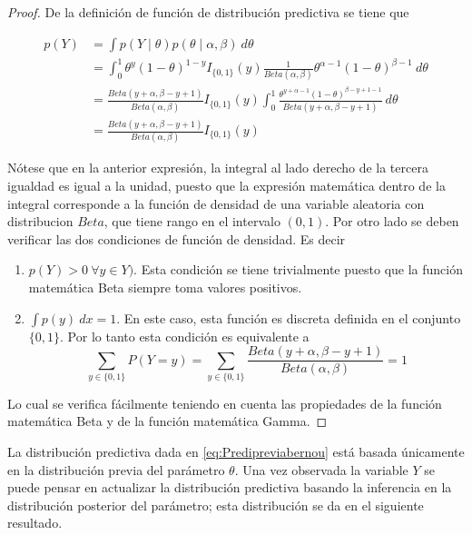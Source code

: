 \documentclass[
  10pt,
  spanish,
]{book}
\providecommand{\tightlist}{%
  \setlength{\itemsep}{0pt}\setlength{\parskip}{0pt}}
\theoremstyle{definition}
\theoremstyle{definition}
\theoremstyle{definition}
\theoremstyle{definition}
\theoremstyle{remark}
\begin{document}
\begin{proof}
{}De la definición de función de distribución predictiva se tiene que

\begin{align*}
p(Y)&=\int p(Y \mid \theta)p(\theta \mid \alpha,\beta)\ d\theta\\
&=\int_0^1 \theta^y(1-\theta)^{1-y}I_{\{0,1\}}(y)\frac{1}{Beta(\alpha,\beta)}\theta^{\alpha-1}(1-\theta)^{\beta-1}\ d\theta\\
&=\frac{Beta(y+\alpha,\beta-y+1)}{Beta(\alpha,\beta)}I_{\{0,1\}}(y)
    \int_0^1\frac{\theta^{y+\alpha-1}(1-\theta)^{\beta-y+1-1}}{Beta(y+\alpha,\beta-y+1)}\ d\theta\\
&=\frac{Beta(y+\alpha,\beta-y+1)}{Beta(\alpha,\beta)}I_{\{0,1\}}(y)
\end{align*}

Nótese que en la anterior expresión, la integral al lado derecho de la tercera igualdad es igual a la unidad, puesto que la expresión matemática dentro de la integral corresponde a la función de densidad de una variable aleatoria con distribucion \(Beta\), que tiene rango en el intervalo \((0,1)\). Por otro lado se deben verificar las dos condiciones de función de densidad. Es decir

\begin{enumerate}
\def\labelenumi{\arabic{enumi}.}
\tightlist
\item
  \(p(Y)>0 \ \forall y \in Y)\). Esta condición se tiene trivialmente puesto que la función matemática Beta siempre toma valores positivos.
\item
  \(\int p(y)\ dx=1\). En este caso, esta función es discreta definida en el conjunto \(\{0,1\}\). Por lo tanto esta condición es equivalente a
  \begin{equation*}
  \sum_{y\in{\{0,1\}}}P(Y=y)=
    \sum_{y\in{\{0,1\}}}\frac{Beta(y+\alpha,\beta-y+1)}{Beta(\alpha,\beta)}
  =1
  \end{equation*}
\end{enumerate}

Lo cual se verifica fácilmente teniendo en cuenta las propiedades de la función matemática Beta y de la función matemática Gamma.
\end{proof}

La distribución predictiva dada en \eqref{eq:Predipreviabernou} está
basada únicamente en la distribución previa del parámetro \(\theta\). Una
vez observada la variable \(Y\) se puede pensar en actualizar la
distribución predictiva basando la inferencia en la distribución
posterior del parámetro; esta distribución se da en el siguiente
resultado.
\end{document}
